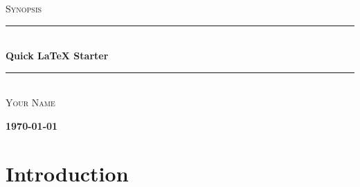 \documentclass[12pt,a4paper,oneside]{report}
\begin{document}
    \begin{titlepage}
        \begin{center}
    
            \vspace*{3cm}
    
            \vspace{2cm}
    
    
    
            \textsc{\large Synopsis} \\[0.5cm]
            
            \rule{\linewidth}{0.5mm} \\[0.4cm]
            { \huge \bfseries Quick \LaTeX{} Starter  \\[0.4cm] }
            \rule{\linewidth}{0.5mm} \\[1.5cm]
            
            \vspace*{2cm}
            \textsc{\Large Your Name} \\[0.5cm]
    
            \vfill
    
    
            \vfill
    
            \textbf{\today}
    
        \end{center}
    \end{titlepage}
    
    
    \setcounter{page}{0}
    \tableofcontents
    \thispagestyle{empty}
    \pagebreak
    
    
\section{Introduction}







\end{document}
